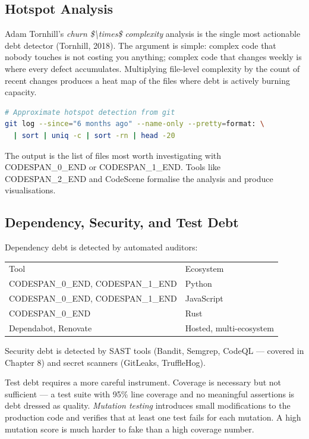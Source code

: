 \documentclass[11pt,a4paper]{book}
\begin{document}
\subsection{Hotspot Analysis}

Adam Tornhill's \textit{churn \$\textbackslash{}times\$ complexity} analysis is the single most actionable debt detector (Tornhill, 2018). The argument is simple: complex code that nobody touches is not costing you anything; complex code that changes weekly is where every defect accumulates. Multiplying file-level complexity by the count of recent changes produces a heat map of the files where debt is actively burning capacity.

\begin{lstlisting}[language=Bash]
# Approximate hotspot detection from git
git log --since="6 months ago" --name-only --pretty=format: \
  | sort | uniq -c | sort -rn | head -20
\end{lstlisting}

The output is the list of files most worth investigating with CODESPAN\_0\_END or CODESPAN\_1\_END. Tools like CODESPAN\_2\_END and CodeScene formalise the analysis and produce visualisations.

\subsection{Dependency, Security, and Test Debt}

Dependency debt is detected by automated auditors:

\begin{tabular}{ll}
\hline
Tool & Ecosystem \\
CODESPAN\_0\_END, CODESPAN\_1\_END & Python \\
CODESPAN\_0\_END, CODESPAN\_1\_END & JavaScript \\
CODESPAN\_0\_END & Rust \\
Dependabot, Renovate & Hosted, multi-ecosystem \\
\hline
\end{tabular}

Security debt is detected by SAST tools (Bandit, Semgrep, CodeQL --- covered in Chapter 8) and secret scanners (GitLeaks, TruffleHog).

Test debt requires a more careful instrument. Coverage is necessary but not sufficient --- a test suite with 95\% line coverage and no meaningful assertions is debt dressed as quality. \textit{Mutation testing} introduces small modifications to the production code and verifies that at least one test fails for each mutation. A high mutation score is much harder to fake than a high coverage number.
\end{document}
